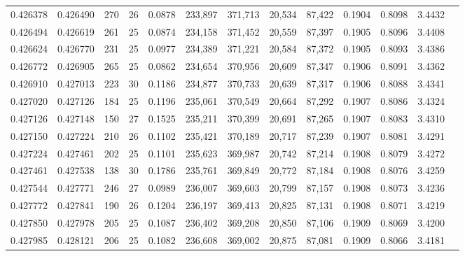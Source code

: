 \begin{tabular}{rrrrrrrrrrrrr}
0.426378 & 0.426490 & 270 &  26 &                                     0.0878 & 233,897 & 371,713 &  20,534 &  87,422 & 0.1904 & 0.8098 & 3.4432 \\
0.426494 & 0.426619 & 261 &  25 &                                     0.0874 & 234,158 & 371,452 &  20,559 &  87,397 & 0.1905 & 0.8096 & 3.4408 \\
0.426624 & 0.426770 & 231 &  25 &                                     0.0977 & 234,389 & 371,221 &  20,584 &  87,372 & 0.1905 & 0.8093 & 3.4386 \\
0.426772 & 0.426905 & 265 &  25 &                                     0.0862 & 234,654 & 370,956 &  20,609 &  87,347 & 0.1906 & 0.8091 & 3.4362 \\
0.426910 & 0.427013 & 223 &  30 &                                     0.1186 & 234,877 & 370,733 &  20,639 &  87,317 & 0.1906 & 0.8088 & 3.4341 \\
0.427020 & 0.427126 & 184 &  25 &                                     0.1196 & 235,061 & 370,549 &  20,664 &  87,292 & 0.1907 & 0.8086 & 3.4324 \\
0.427126 & 0.427148 & 150 &  27 &                                     0.1525 & 235,211 & 370,399 &  20,691 &  87,265 & 0.1907 & 0.8083 & 3.4310 \\
0.427150 & 0.427224 & 210 &  26 &                                     0.1102 & 235,421 & 370,189 &  20,717 &  87,239 & 0.1907 & 0.8081 & 3.4291 \\
0.427224 & 0.427461 & 202 &  25 &                                     0.1101 & 235,623 & 369,987 &  20,742 &  87,214 & 0.1908 & 0.8079 & 3.4272 \\
0.427461 & 0.427538 & 138 &  30 &                                     0.1786 & 235,761 & 369,849 &  20,772 &  87,184 & 0.1908 & 0.8076 & 3.4259 \\
0.427544 & 0.427771 & 246 &  27 &                                     0.0989 & 236,007 & 369,603 &  20,799 &  87,157 & 0.1908 & 0.8073 & 3.4236 \\
0.427772 & 0.427841 & 190 &  26 &                                     0.1204 & 236,197 & 369,413 &  20,825 &  87,131 & 0.1908 & 0.8071 & 3.4219 \\
0.427850 & 0.427978 & 205 &  25 &                                     0.1087 & 236,402 & 369,208 &  20,850 &  87,106 & 0.1909 & 0.8069 & 3.4200 \\
0.427985 & 0.428121 & 206 &  25 &                                     0.1082 & 236,608 & 369,002 &  20,875 &  87,081 & 0.1909 & 0.8066 & 3.4181 \\

\end{tabular}

